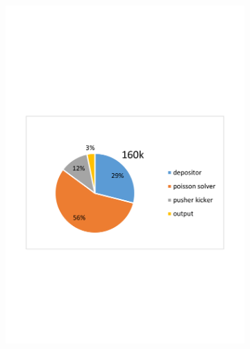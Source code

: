 \begin{figure}[!htb]
\begin{subfigure}[b]{0.75\textwidth}
        \includegraphics[width=\textwidth]{Img/PIC_speedup_1GPU_percentage2.pdf}
    \end{subfigure}
    \quad
    \begin{subfigure}[b]{0.75\textwidth}

\end{subfigure}
\end{figure}
